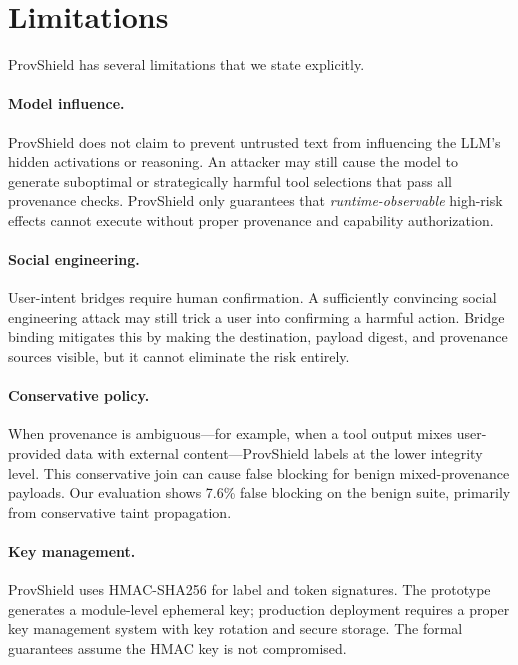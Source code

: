 \documentclass[sigconf,anonymous,review]{acmart}
\begin{document}
\section{Limitations}
\label{sec:limitations}

ProvShield has several limitations that we state explicitly.

\paragraph{Model influence.} ProvShield does not claim to prevent untrusted text from influencing the LLM's hidden activations or reasoning. An attacker may still cause the model to generate suboptimal or strategically harmful tool selections that pass all provenance checks. ProvShield only guarantees that \emph{runtime-observable} high-risk effects cannot execute without proper provenance and capability authorization.

\paragraph{Social engineering.} User-intent bridges require human confirmation. A sufficiently convincing social engineering attack may still trick a user into confirming a harmful action. Bridge binding mitigates this by making the destination, payload digest, and provenance sources visible, but it cannot eliminate the risk entirely.

\paragraph{Conservative policy.} When provenance is ambiguous---for example, when a tool output mixes user-provided data with external content---ProvShield labels at the lower integrity level. This conservative join can cause false blocking for benign mixed-provenance payloads. Our evaluation shows 7.6\% false blocking on the benign suite, primarily from conservative taint propagation.

\paragraph{Key management.} ProvShield uses HMAC-SHA256 for label and token signatures. The prototype generates a module-level ephemeral key; production deployment requires a proper key management system with key rotation and secure storage. The formal guarantees assume the HMAC key is not compromised.
\end{document}
